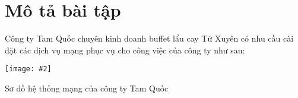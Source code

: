 \documentclass[a4paper]{article} %
\newcommand{\figmini}[4][.93]{%
    \begin{minipage}{#1\linewidth}
        \captionsetup{type=figure, width=#1\linewidth}
        \texttt{[image: \#2]}
        \caption{\centering #4}
        \label{#3}
    \end{minipage}%
}
\begin{document}


\renewcommand{\contentsname}{MỤC LỤC}
\tableofcontents
\thispagestyle{empty}
\cleardoublepage


\setlength{\cftfigindent}{0pt}
\setlength{\cftfignumwidth}{4em}
\renewcommand{\figurename}{\fontsize{12pt}{0pt}\selectfont Hình}
\renewcommand{\cftfigpresnum}{\figurename~}
\renewcommand{\listfigurename}{DANH MỤC HÌNH}
\listoffigures
\cleardoublepage

\renewcommand{\lstlistingname}{\fontsize{12pt}{0pt}\selectfont Code}
\renewcommand{\lstlistlistingname}{DANH MỤC CODE}


\makeatother

\lstlistoflistings
\cleardoublepage


\listoftables
\cleardoublepage


\section*{Mô tả bài tập}

Công ty Tam Quốc chuyên kinh doanh buffet lẩu cay Tứ Xuyên có nhu cầu cài đặt
các dịch vụ mạng phục vụ cho công việc của công ty như sau:

\setcounter{section}{0}
\setcounter{subsection}{1}
\setcounter{figure}{0}
\figmini{./imgs/Hinh-1.png}{fig:main}{Sơ đồ hệ thống mạng của công ty Tam Quốc}


\setcounter{subsection}{0}

\newpage
\end{document}

